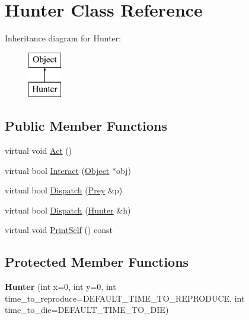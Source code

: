 \hypertarget{classHunter}{
\section{Hunter Class Reference}
\label{classHunter}
}
Inheritance diagram for Hunter:\begin{figure}[H]
\begin{center}
\leavevmode
\includegraphics[height=2cm]{classHunter}
\end{center}
\end{figure}
\subsection*{Public Member Functions}
\begin{DoxyCompactItemize}
\item 
virtual void \hyperlink{classHunter_ac8bed4eeb2bfebcf7df72ba7359ac204}{Act} ()
\item 
virtual bool \hyperlink{classHunter_aad1bd13407503496a74ae1a6c689e64f}{Interact} (\hyperlink{classObject}{Object} $\ast$obj)
\item 
virtual bool \hyperlink{classHunter_aac1480382681187d650a9122dee9971c}{Dispatch} (\hyperlink{classPrey}{Prey} \&p)
\item 
virtual bool \hyperlink{classHunter_aa73667bb3b20a06d8c398eb2760e2902}{Dispatch} (\hyperlink{classHunter}{Hunter} \&h)
\item 
virtual void \hyperlink{classHunter_a9b193792622fd203df15bf755753e9bd}{PrintSelf} () const 
\end{DoxyCompactItemize}
\subsection*{Protected Member Functions}
\begin{DoxyCompactItemize}
\item 
\hypertarget{classHunter_a24cf0cbb9ca4df6886bcdff91c2aa9a2}{
{\bfseries Hunter} (int x=0, int y=0, int time\_\-to\_\-reproduce=DEFAULT\_\-TIME\_\-TO\_\-REPRODUCE, int time\_\-to\_\-die=DEFAULT\_\-TIME\_\-TO\_\-DIE)}
\label{classHunter_a24cf0cbb9ca4df6886bcdff91c2aa9a2}

\end{DoxyCompactItemize}


